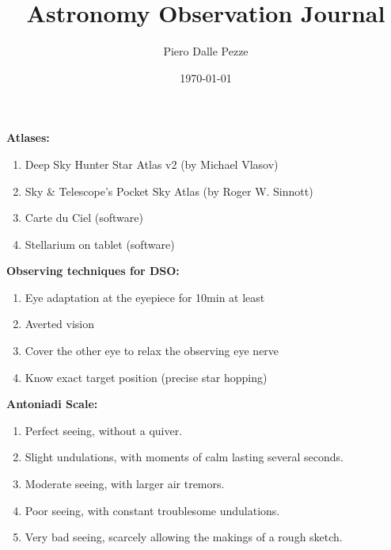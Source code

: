 \documentclass[10pt,twoside,a4paper]{article}
\title{Astronomy Observation Journal}
\author{Piero Dalle Pezze}
\date{\today}
\begin{document}
 
\maketitle 
\let\thefootnote\relax{} 
 
\newpage 
 
\footnotesize 
 
\noindent  
 
{\bf Atlases:} 
\begin{enumerate}   
\item Deep Sky Hunter Star Atlas v2 (by Michael Vlasov) 
\item Sky \& Telescope's Pocket Sky Atlas (by Roger W. Sinnott) 
\item Carte du Ciel (software) 
\item Stellarium on tablet (software) 
\end{enumerate} 
 
\bigskip  
{\bf Observing techniques for DSO:} 
\begin{enumerate} 
\item Eye adaptation at the eyepiece for 10min at least  
\item Averted vision  
\item Cover the other eye to relax the observing eye nerve  
\item Know exact target position (precise star hopping)  
\end{enumerate}  
 
\bigskip  
{\bf Antoniadi Scale:} 
\begin{enumerate} 
\item Perfect seeing, without a quiver. 
\item Slight undulations, with moments of calm lasting several seconds. 
\item Moderate seeing, with larger air tremors. 
\item Poor seeing, with constant troublesome undulations. 
\item Very bad seeing, scarcely allowing the makings of a rough sketch. 
\end{enumerate} 
 
\end{document}
